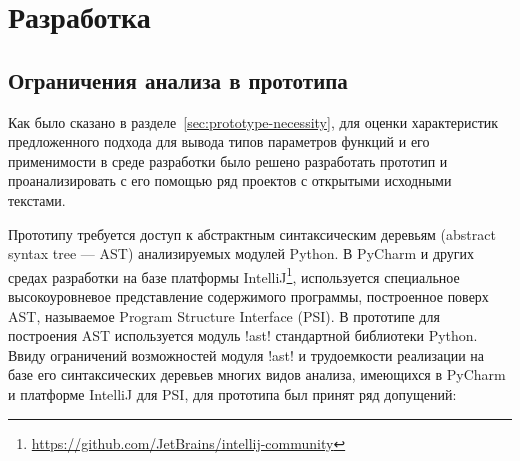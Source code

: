 \chapter{Разработка}
\label{sec:development}

\section{Ограничения анализа в прототипа}
\label{sec:prototype-limits}

Как было сказано в разделе~\ref{sec:prototype-necessity}, для оценки
характеристик предложенного подхода для вывода типов параметров функций и его
применимости в среде разработки было решено разработать прототип и
проанализировать с его помощью ряд проектов с открытыми исходными текстами.

Прототипу требуется доступ к абстрактным синтаксическим деревьям (abstract
syntax tree --- AST) анализируемых модулей Python. В PyCharm и других средах
разработки на базе платформы
IntelliJ\footnote{\url{https://github.com/JetBrains/intellij-community}},
используется специальное высокоуровневое представление содержимого программы,
построенное поверх AST, называемое Program Structure Interface (PSI). 
В прототипе для построения AST используется модуль !ast! стандартной библиотеки
Python. Ввиду ограничений возможностей модуля !ast! и трудоемкости реализации на
базе его синтаксических деревьев многих видов анализа, имеющихся в PyCharm и
платформе IntelliJ для PSI, для прототипа был принят ряд допущений:

